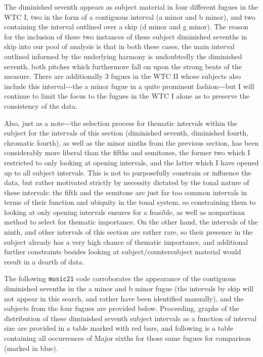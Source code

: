 The diminished seventh appears as subject material in four different
fugues in the WTC I, two in the form of a contiguous interval (a minor
and b minor), and two containing the interval outlined over a skip (d
minor and g minor). The reason for the inclusion of these two instances
of these subject diminished sevenths in skip into our pool of analysis
is that in both these cases, the main interval outlined informed by the
underlying harmony is undoubtedly the diminished seventh, both pitches
which furthermore fall on upon the strong beats of the measure. There
are additionally 3 fugues in the WTC II whose subjects also include this
interval-\/-\/-the a minor fugue in a quite prominent fashion-\/-\/-but
I will continue to limit the focus to the fugues in the WTC I alone as
to preserve the consistency of the data.

Also, just as a note-\/-\/-the selection process for thematic intervals
within the subject for the intervals of this section (diminished
seventh, diminished fourth, chromatic fourth), as well as the minor
ninths from the previous section, has been considerably more liberal
than the fifths and semitones, the former two which I restricted to only
looking at opening intervals, and the latter which I have opened up to
all subject intervals. This is not to purposefully constrain or
influence the data, but rather motivated strictly by necessity dictated
by the tonal nature of these intervals: the fifth and the semitone are
just far too common intervals in terms of their function and ubiquity in
the tonal system, so constraining them to looking at only opening
intervals ensures for a feasible, as well as nonpartisan method to
select for thematic importance. On the other hand, the intervals of the
ninth, and other intervals of this section are rather rare, so their
presence in the subject already has a very high chance of thematic
importance, and additional further constraints besides looking at
subject/countersubject material would result in a dearth of data.

The following \texttt{music21} code corroborates the appearance of the
contiguous diminished sevenths in the a minor and b minor fugue (the
intervals by skip will not appear in this search, and rather have been
identified manually), and the subjects from the four fugues are provided
below. Proceeding, graphs of the distribution of these diminished
seventh subject intervals as a function of interval size are provided in
a table marked with red bars, and following is a table containing all
occurrences of Major sixths for those same fugues for comparison (marked
in blue).

